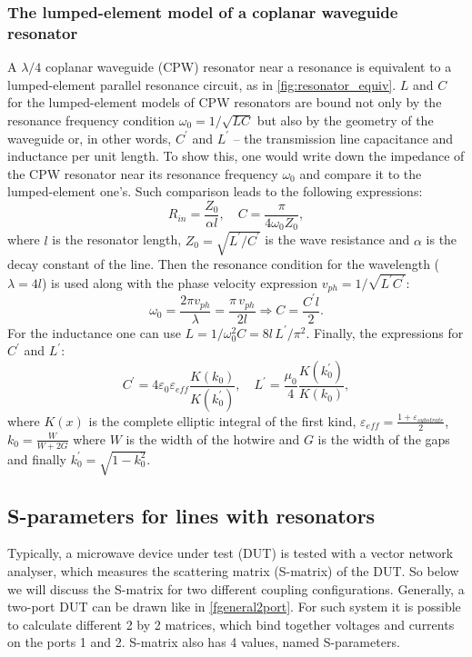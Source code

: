 \subsubsection{The lumped-element model of a coplanar waveguide resonator}\label{ssec:LE-model}
A $\lambda/4$ coplanar waveguide (CPW) resonator near a resonance is equivalent to a lumped-element parallel resonance circuit, as in \autoref{fig:resonator_equiv}. $L$ and $C$ for the lumped-element models of CPW resonators are bound not only by the resonance frequency condition $\omega_0 = 1/\sqrt{LC}$ but also by the geometry of the waveguide or, in other words, $C^\prime$ and $L^\prime$ -- the transmission line capacitance and inductance per unit length. To show this, one would write down the impedance of the CPW resonator near its resonance frequency $\omega_0$ and compare it to the lumped-element one's\cite{pozar2012}. Such comparison leads to the following expressions:
\[
R_{in} = \frac{Z_0}{\alpha l}, \quad C = \frac{\pi}{4\omega_0 Z_0},
\]
where $l$ is the resonator length, $Z_0 = \sqrt{L^\prime/C^\prime}$ is the wave resistance and $\alpha$ is the decay constant of the line. Then the resonance condition for the wavelength ($\lambda = 4 l$) is used along with the phase velocity expression $v_{ph} = 1/\sqrt{L^\prime C^\prime}$:
\[
\omega_0 = \frac{2\pi v_{ph}}{\lambda} =  \frac{\pi \, v_{ph}}{2 l} \Rightarrow  C = \frac{C^\prime l}{2}.
\]
For the inductance one can use $L = 1/\omega_0^2 C = 8 l\, L^\prime/\pi^2$. Finally, the expressions for $C^\prime$ and $L^\prime$:
\[
C^\prime = 4\varepsilon_0\varepsilon_{eff} \frac{K(k_0)}{K(k_0^\prime)},\quad
L^\prime = \frac{\mu_0}{4} \frac{K(k_0^\prime)}{K(k_0)},
\]
where $K(x)$ is the complete elliptic integral of the first kind, $\varepsilon_{eff} = \frac{1+\varepsilon_{substrate}}{2}$, $k_0 = \frac{W}{W+2G}$ where $W$ is the width of the hotwire and $G$ is the width of the gaps and finally $k_0^\prime = \sqrt{1-k_0^2}$.

\subsection{S-parameters for lines with resonators}

Typically, a microwave device under test (DUT) is tested with a vector network analyser, which measures the scattering matrix (S-matrix) of the DUT. So below we will discuss the S-matrix for two different coupling configurations. Generally, a two-port DUT can be drawn like in \autoref{fgeneral2port}. For such system it is possible to calculate different 2 by 2 matrices, which bind together voltages and currents on the ports 1 and 2. S-matrix also has 4 values, named S-parameters.

